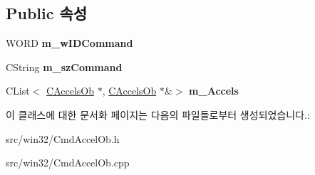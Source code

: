 \subsection*{Public 속성}
\begin{DoxyCompactItemize}
\item 
\mbox{\label{class_c_cmd_accel_ob_aa3eb02dcd39ff14763fdefd8fabd7591}} 
W\+O\+RD {\bfseries m\+\_\+w\+I\+D\+Command}
\item 
\mbox{\label{class_c_cmd_accel_ob_acbd02cc68d3909b1e39b687e76f45d91}} 
C\+String {\bfseries m\+\_\+sz\+Command}
\item 
\mbox{\label{class_c_cmd_accel_ob_a85772f1ea9204af42b8a39a0135dc0f8}} 
C\+List$<$ \mbox{\hyperlink{class_c_accels_ob}{C\+Accels\+Ob}} $\ast$, \mbox{\hyperlink{class_c_accels_ob}{C\+Accels\+Ob}} $\ast$\&$>$ {\bfseries m\+\_\+\+Accels}
\end{DoxyCompactItemize}


이 클래스에 대한 문서화 페이지는 다음의 파일들로부터 생성되었습니다.\+:\begin{DoxyCompactItemize}
\item 
src/win32/Cmd\+Accel\+Ob.\+h\item 
src/win32/Cmd\+Accel\+Ob.\+cpp\end{DoxyCompactItemize}
